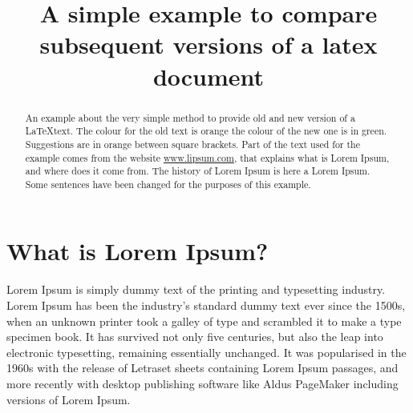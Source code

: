 \documentclass[]{article}
\title{A simple example to compare  
subsequent
versions of a latex document}
\author{}
\begin{document}
\maketitle

\begin{abstract}
An example about the very simple method to provide old and new version of a \LaTeX text. The colour for the old text is orange the colour of the new one is in green. Suggestions are in orange between square brackets. Part of the text used for the example comes from the 
website \href{www.lipsum.com}{www.lipsum.com}, that explains what is Lorem Ipsum, and where does it come from.
The history of Lorem Ipsum is here a Lorem Ipsum.
Some sentences 
have been 
changed for the purposes of this example.




\end{abstract}

\section{What is Lorem Ipsum?}

Lorem Ipsum is simply dummy text of the printing and typesetting industry. Lorem Ipsum has been the industry's standard dummy text ever since the 1500s, when an unknown printer took a galley of type and scrambled it to make a type specimen book. It has survived not only five centuries, but also the leap into electronic typesetting, remaining essentially unchanged. It was 
popularised in the 1960s with the release of Letraset sheets 
containing Lorem Ipsum passages, and more recently with desktop publishing software like Aldus PageMaker including versions of Lorem Ipsum.
\end{document}

